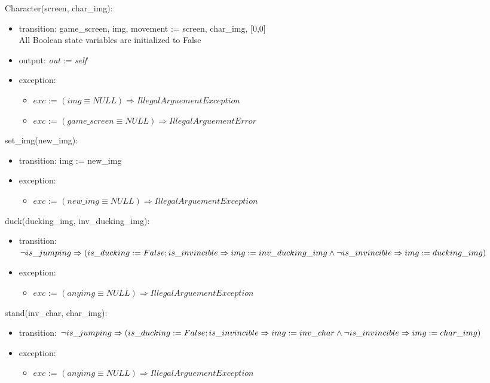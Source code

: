 \documentclass[12pt]{article}
\begin{document}
\noindent Character(screen, char\_img):
\begin{itemize}
\item transition: game\_screen, img, movement := screen, char\_img, [0,0]\\ All Boolean state variables are initialized to False
\item output: \textit{out} := \textit{self}
\item exception: 
    \begin{itemize}[]
        \item $exc$ := $(img \equiv NULL) \Rightarrow IllegalArguementException$
        \item $exc$ := $(game\_screen \equiv NULL) \Rightarrow IllegalArguementError$
    \end{itemize}
\end{itemize}

\noindent set\_img(new\_img):
\begin{itemize}
    \item transition: img := new\_img
\item exception: 
    \begin{itemize}[]
        \item $exc$ := $(new\_img \equiv NULL) \Rightarrow IllegalArguementException$
    \end{itemize}    
\end{itemize}

\noindent duck(ducking\_img, inv\_ducking\_img):
\begin{itemize}
\item transition: $\neg is\_jumping \Rightarrow (is\_ducking := False;\\
is\_invincible \Rightarrow img := inv\_ducking\_img \land \neg is\_invincible \Rightarrow img := ducking\_img)$
\item exception:
    \begin{itemize}[]
        \item   $exc$ := $(any img \equiv NULL) \Rightarrow IllegalArguementException$
    \end{itemize}
\end{itemize}

\noindent stand(inv\_char, char\_img):
\begin{itemize}
\item transition: $\neg is\_jumping \Rightarrow (is\_ducking := False;\\
is\_invincible \Rightarrow img := inv\_char \land \neg is\_invincible \Rightarrow img := char\_img)$
\item exception:
    \begin{itemize}[]
        \item   $exc$ := $(any img \equiv NULL) \Rightarrow IllegalArguementException$
    \end{itemize}
\end{itemize}
\end{document}
